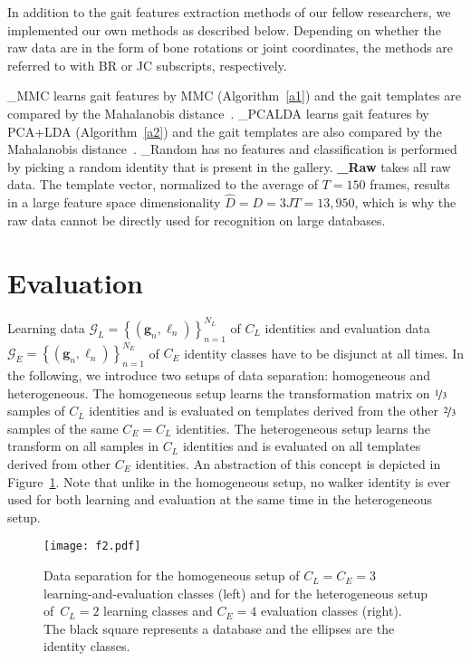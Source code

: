 \documentclass[10pt,a4paper]{llncs}
\newcommand{\gC}{\ensuremath{C}} %
\newcommand{\gD}{\ensuremath{D}} %
\newcommand{\gG}{\ensuremath{\mathcal{G}}} %
\newcommand{\gGn}[1]{\ensuremath{\gB{g}_{#1}}} %
\newcommand{\gJ}{\ensuremath{J}} %
\newcommand{\gLAMBDAn}[1]{\ensuremath{\ell_{#1}}} %
\newcommand{\gN}{\ensuremath{N}} %
\newcommand{\gT}{\ensuremath{T}} %
\newcommand{\gB}[1]{\ensuremath{\mathbf{#1}}} %
\newcommand{\gH}[1]{\ensuremath{\widehat{#1}}} %
\newcommand{\gL}[1]{\ensuremath{{#1}_L}} %
\newcommand{\gE}[1]{\ensuremath{{#1}_E}} %
\begin{document}
In addition to the gait features extraction methods of our fellow researchers, we implemented our own methods as described below. Depending on whether the raw data are in the form of bone rotations or joint coordinates, the methods are referred to with BR or JC subscripts, respectively.
\begin{itemize}
\method \_MMC learns gait features by MMC (Algorithm~\ref{a1}) and the gait templates are compared by the Mahalanobis distance~\cite{BS16a,BS16b}.
\method \_PCALDA learns gait features by PCA+LDA (Algorithm~\ref{a2}) and the gait templates are also compared by the Mahalanobis distance~\cite{BS16a,BS16b}.
\method \_Random has no features and classification is performed by picking a random identity that is present in the gallery.
\method \textbf{\_Raw} takes all raw data. The template vector, normalized to the average of $\gT=150$ frames, results in a large feature space dimensionality $\gH{\gD}=\gD=3\gJ\gT=13{,}950$, which is why the raw data cannot be directly used for recognition on large databases.
\end{itemize}

\section{Evaluation}
\label{eval}

Learning data $\gL{\gG}=\left\{\left(\gGn{n},\gLAMBDAn{n}\right)\right\}_{n=1}^{\gL{\gN}}$ of $\gL{\gC}$ identities and evaluation data $\gE{\gG}=\left\{\left(\gGn{n},\gLAMBDAn{n}\right)\right\}_{n=1}^{\gE{\gN}}$ of $\gE{\gC}$ identity classes have to be disjunct at all times. In the following, we introduce two setups of data separation: homogeneous and heterogeneous. The homogeneous setup learns the transformation matrix on $\nicefrac{1}{3}$ samples of $\gL{\gC}$ identities and is evaluated on templates derived from the other $\nicefrac{2}{3}$ samples of the same $\gE{\gC}=\gL{\gC}$ identities. The heterogeneous setup learns the transform on all samples in $\gL{\gC}$ identities and is evaluated on all templates derived from other $\gE{\gC}$ identities. An abstraction of this concept is depicted in Figure~\ref{f2}. Note that unlike in the homogeneous setup, no walker identity is ever used for both learning and evaluation at the same time in the heterogeneous setup.

\begin{figure}[ht]
\centering
\texttt{[image: f2.pdf]}
\caption{Data separation for the homogeneous setup of $\gL{\gC}=\gE{\gC}=3$ learning-and-evaluation classes (left) and for the heterogeneous setup of~$\gL{\gC}=2$ learning classes and $\gE{\gC}=4$ evaluation classes (right). The black square represents a database and the ellipses are the identity classes.}
\label{f2}
\end{figure}
\end{document}
